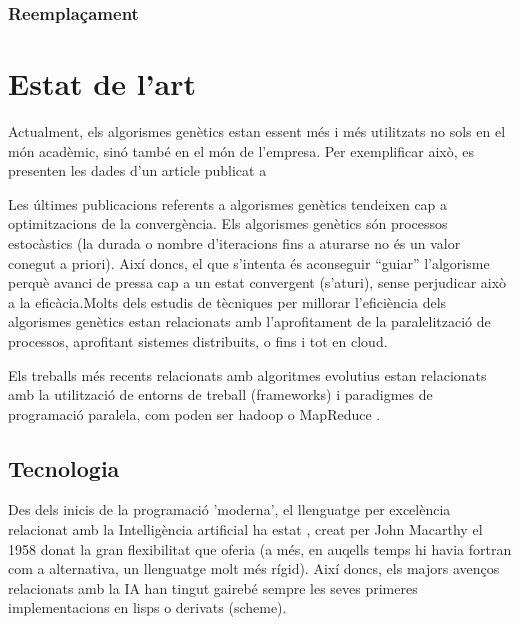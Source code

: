 \subsubsection{Reemplaçament} %
\label{ssub:Reemplacament}


\section{Estat de l'art} %
\label{sec:Estat de l'art}

Actualment, els algorismes genètics estan essent més i més utilitzats no sols en
el món acadèmic, sinó també en el món de l'empresa.  Per exemplificar això, es
presenten les dades d'un article publicat a 

Les últimes publicacions referents a algorismes genètics tendeixen cap a
optimitzacions de la convergència.  Els algorismes genètics són processos
estocàstics (la durada o nombre d'iteracions fins a aturarse no és un valor
conegut a priori).  Així doncs, el que s'intenta és aconseguir ``guiar''
l'algorisme perquè avanci de pressa cap a un estat convergent (s'aturi), sense
perjudicar això a la eficàcia.Molts dels estudis de tècniques per millorar
l'eficiència dels algorismes genètics estan relacionats amb l'aprofitament de la
paralelització de processos, aprofitant sistemes distribuits, o fins i tot en
cloud.  

Els treballs més recents relacionats amb algoritmes evolutius estan relacionats
amb la utilització de entorns de treball (frameworks) i paradigmes de
programació paralela, com poden ser hadoop o MapReduce \cite{VLCG09}.

\subsection{Tecnologia} %
\label{sub:Tecnologia}

Des dels inicis de la programació 'moderna', el llenguatge per excelència
relacionat amb la Intelligència artificial ha estat \cite{JMC59}, creat per John
Macarthy el 1958 donat la gran flexibilitat que oferia (a més, en auqells temps
hi havia fortran com a alternativa, un llenguatge molt més rígid).  Així doncs,
els majors avenços relacionats amb la IA han tingut gairebé sempre les seves
primeres implementacions en lisps o derivats (scheme).  


